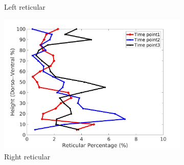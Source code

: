 \begin{figure}[H]
\begin{subfigure}{.42\linewidth}
  \caption{Left reticular}
  \label{fig:IPF21DiseaseDorsoToVentral-c} 
\end{subfigure} 
\begin{subfigure}{.42\linewidth}%
  \includegraphics[width=\linewidth,trim={{.0\wd0} {.0\wd0} {.0\wd0} {.0\wd0}},clip]{Appendix/Image_AppexA/DorsoToVentral/IPF21RightLungReticularDiseaseDorsoToVentral.jpg}
  \caption{Right reticular}
  \label{fig:IPF21DiseaseDorsoToVentral-d}
\end{subfigure}
\begin{subfigure}{.42\linewidth}%

\end{subfigure}
\end{figure}
